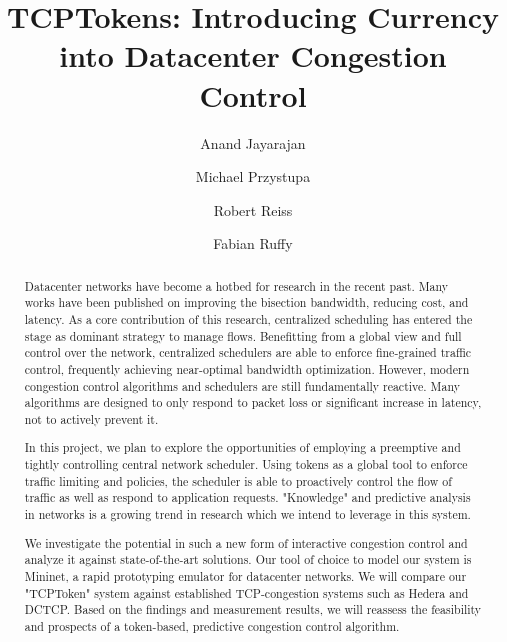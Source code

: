 \documentclass[sigconf]{acmart}
\begin{document}
\title{TCPTokens: Introducing Currency into Datacenter Congestion Control}

\author{Anand Jayarajan}

\author{Michael Przystupa}

\author{Robert Reiss}

\author{Fabian Ruffy}

\begin{abstract}
Datacenter networks have become a hotbed for research in the recent past. Many works have been published on improving the  bisection bandwidth, reducing cost, and latency. As a core contribution of this research, centralized scheduling has entered the stage as dominant strategy to manage flows. Benefitting from a global view and full control over the network, centralized schedulers are able to enforce fine-grained traffic control, frequently achieving near-optimal bandwidth optimization. However, modern congestion control algorithms and schedulers are still fundamentally reactive. Many algorithms are designed to only respond to packet loss or significant increase in latency, not to actively prevent it.

In this project, we plan to explore the opportunities of employing a preemptive and tightly controlling central network scheduler. Using tokens as a global tool to enforce traffic limiting and policies, the scheduler is able to proactively control the flow of traffic as well as respond to application requests. "Knowledge" and predictive analysis in networks is a growing trend in research which we intend to leverage in this system.

We investigate the potential in such a new form of interactive congestion control and analyze it against state-of-the-art solutions. Our tool of choice to model our system is Mininet, a rapid prototyping emulator for datacenter networks. We will compare our "TCPToken" system against established TCP-congestion systems such as Hedera and DCTCP. Based on the findings and measurement results, we will reassess the feasibility and prospects of a token-based, predictive congestion control algorithm.
\end{abstract}
\end{document}

